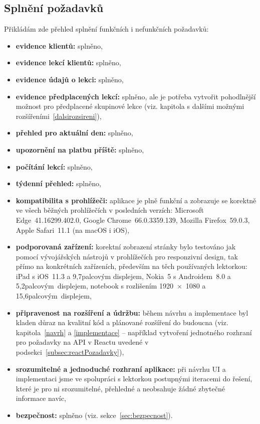         \subsection{Splnění požadavků}
        Přikládám zde přehled splnění funkčních i nefunkčních požadavků:
        \begin{itemize}
            \item \textbf{evidence klientů:} splněno,
            \item \textbf{evidence lekcí klientů:} splněno,
            \item \textbf{evidence údajů o lekci:} splněno,
            \item \textbf{evidence předplacených lekcí:} splněno, ale je potřeba vytvořit pohodlnější možnost pro předplacené skupinové lekce (viz. kapitola s dalšími možnými rozšířeními~\ref{dalsirozsireni}),
            \item \textbf{přehled pro aktuální den:} splněno,
            \item \textbf{upozornění na platbu příště:} splněno,
            \item \textbf{počítání lekcí:} splněno,
            \item \textbf{týdenní přehled:} splněno,
            \item \textbf{kompatibilita s prohlížeči:} aplikace je plně funkční a zobrazuje se korektně ve všech běžných prohlížečích v posledních verzích: Microsoft Edge~41.16299.402.0, Google Chrome~66.0.3359.139, Mozilla Firefox~59.0.3, Apple Safari~11.1 (na macOS i iOS),
            \item \textbf{podporovaná zařízení:} korektní zobrazení stránky bylo testováno jak pomocí vývojářských nástrojů v prohlížečích pro responzivní design, tak přímo na konkrétních zařízeních, především na těch používaných lektorkou: iPad s iOS~11.3 a 9,7palcovým displejem, Nokia~5 s Androidem~8.0 a 5,2palcovým~displejem, notebook s rozlišením 1920~×~1080 a 15,6palcovým~displejem,
            \item \textbf{připravenost na rozšíření a údržbu:} během návrhu a implementace byl kladen důraz na kvalitní kód a plánované rozšíření do budoucna (viz. kapitola~\ref{navrh} a \ref{implementace} -- například vytvoření jednotného rozhraní pro požadavky na API v Reactu uvedené v podsekci~\ref{subsec:reactPozadavky}),
            \item \textbf{srozumitelné a jednoduché rozhraní aplikace:} při návrhu UI a implementaci jsme ve spolupráci s lektorkou postupnými iteracemi do řešení, které je pro ni srozumitelné, přehledné a neobsahuje žádné zbytečné informace navíc,
            \item \textbf{bezpečnost:} splněno (viz. sekce~\ref{sec:bezpecnost}).
        \end{itemize}
        
